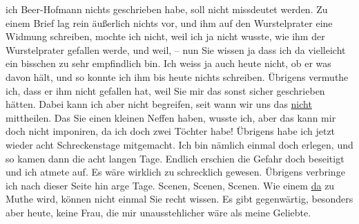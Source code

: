 \begin{ledgroupsized}[t]{13cm}
               ich Beer-Hofmann nichts geschrieben habe, soll
               nicht missdeutet werden. Zu einem Brief lag rein äußerlich nichts vor, und ihm auf
               den Wurstelprater eine Widmung schreiben, mochte
               ich nicht, weil ich ja nicht wusste, wie ihm der Wurstelprater gefallen werde, und weil, – nun Sie wissen ja dass ich da
               vielleicht ein bisschen zu sehr empfindlich bin. Ich weiss ja auch heute nicht, ob er
               was davon hält, und so konnte ich ihm bis heute nichts schreiben. Übrigens vermuthe
               ich, dass er ihm nicht gefallen hat, weil Sie mir das sonst sicher geschrieben
               hätten. Dabei kann ich aber nicht begreifen, {\pb}seit wann wir uns das \uline{nicht }mittheilen. Das Sie einen kleinen Neffen haben, wusste ich,
               aber das kann mir doch nicht imponiren, da ich doch zwei Töchter habe! Übrigens habe ich
               jetzt wieder acht Schreckenstage mitgemacht. Ich bin nämlich einmal doch erlegen, und
               so kamen dann die acht langen Tage. Endlich erschien die Gefahr doch beseitigt und
               ich atmete auf. Es wäre wirklich zu schrecklich gewesen. Übrigens verbringe ich nach
               dieser Seite hin arge Tage. Scenen, Scenen, Scenen. Wie einem \uline{da} zu Muthe wird, können nicht einmal Sie recht wissen. Es gibt
               gegenwärtig, besonders aber heute, keine Frau, die mir unausstehlicher wäre als meine
                  Geliebte.

\end{ledgroupsized}
